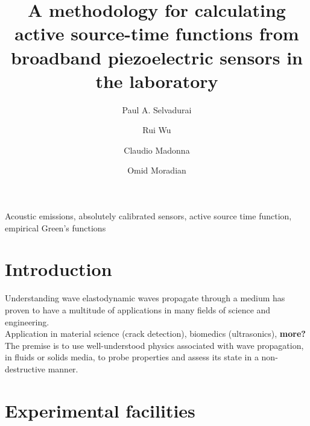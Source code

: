 \documentclass[preprint,3p, 11pt,authoryear]{elsarticle}
\begin{document}
\begin{frontmatter}



\title{A methodology for calculating active source-time functions from broadband piezoelectric sensors in the laboratory}

 \author[1]{Paul A. Selvadurai }
\author[2]{Rui Wu}
\author[3]{Claudio Madonna}
\author[2]{Omid Moradian}




\address[1]{Swiss Seismological Service, ETH Zurich, Zurich, Switzerland}
\address[2]{Engineering Geology Group, ETH Zurich, Zurich, Switzerland}
\address[3]{Department of Earth Sciences, ETH Zurich, Zurich, Switzerland}



\begin{abstract}

\end{abstract}

\begin{keyword}
Acoustic emissions, absolutely calibrated sensors, active source time function, empirical Green's functions
\end{keyword}
\end{frontmatter}

\doublespacing
\linenumbers
\clearpage
\section{Introduction}
\label{int}

Understanding wave elastodynamic waves propagate through a medium has proven to have a multitude of applications in many fields of science and engineering.  
\\

Application in material science (crack detection), biomedics (ultrasonics), \textbf{more?} 
\\
The premise is to use well-understood physics associated with wave propagation, in fluids or solids media, to probe properties and assess its state in a non-destructive manner. 


\section{Experimental facilities}
\end{document}
